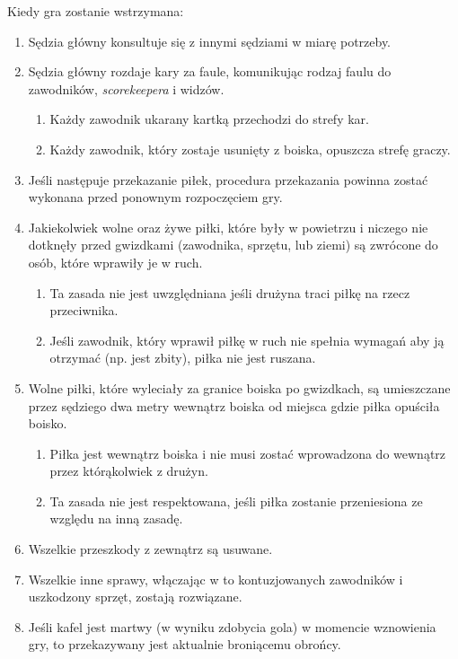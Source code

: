 \documentclass[11pt,a4paper]{article}
\renewcommand{\subsubsection}[1]{
  \oldsubsubsection{#1}%
  \label{\thesubsubsection}
}
\begin{document}
\subsubsection{Procedura wstrzymania}
Kiedy gra zostanie wstrzymana:
\begin{enumerate}
  \item Sędzia główny konsultuje się z innymi sędziami w miarę potrzeby.
  \item Sędzia główny rozdaje kary za faule, komunikując rodzaj faulu do zawodników, \emph{scorekeepera} i widzów.
  \begin{enumerate}
    \item Każdy zawodnik ukarany kartką przechodzi do strefy kar.
    \item Każdy zawodnik, który zostaje usunięty z boiska, opuszcza strefę graczy.
  \end{enumerate}
  \item Jeśli następuje przekazanie piłek, procedura przekazania powinna zostać wykonana
  przed ponownym rozpoczęciem gry.
  \item Jakiekolwiek wolne oraz żywe piłki, które były w powietrzu i niczego nie dotknęły przed
  gwizdkami (zawodnika, sprzętu, lub ziemi) są zwrócone do osób, które wprawiły je w ruch.
  \begin{enumerate}
    \item Ta zasada nie jest uwzględniana jeśli drużyna traci piłkę na rzecz przeciwnika.
    \item Jeśli zawodnik, który wprawił piłkę w ruch nie spełnia wymagań aby ją otrzymać (np. jest zbity), piłka nie jest ruszana.
  \end{enumerate}
  \item Wolne piłki, które wyleciały za granice boiska po gwizdkach, są umieszczane przez sędziego dwa metry wewnątrz boiska od miejsca gdzie piłka opuściła boisko.
  \begin{enumerate}
    \item Piłka jest wewnątrz boiska i nie musi zostać wprowadzona do wewnątrz przez którąkolwiek z drużyn.
    \item Ta zasada nie jest respektowana, jeśli piłka zostanie przeniesiona ze względu na inną zasadę.
  \end{enumerate}
  \item Wszelkie przeszkody z zewnątrz są usuwane.
  \item Wszelkie inne sprawy, włączając w to kontuzjowanych zawodników i uszkodzony sprzęt, zostają rozwiązane.
  \item Jeśli kafel jest martwy (w wyniku zdobycia gola) w momencie wznowienia gry, to przekazywany jest aktualnie broniącemu obrońcy.
\end{enumerate}
\end{document}

